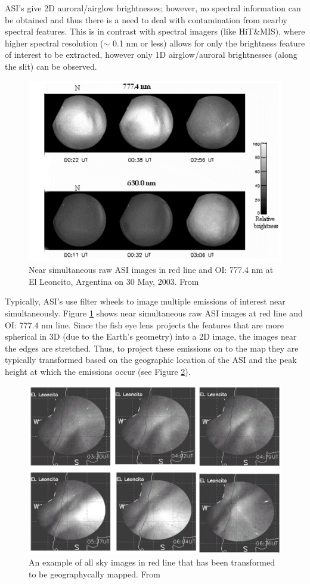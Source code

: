\documentclass[crop=false,class=mitthesis,oneside,font=12pt]{standalone}
\begin{document}
ASI's give 2D auroral/airglow brightnesses; however, no spectral information can be obtained and thus there is a need to deal with contamination from nearby spectral features. This is in contrast with spectral imagers (like HiT\&MIS), where higher spectral resolution ($\sim$ 0.1 nm or less) allows for only the brightness feature of interest to be extracted, however only 1D airglow/auroral brightnesses (along the slit) can be observed.
\begin{figure}[H]
	\centering\includegraphics[width=30pc]{asi_mul.png}
	\caption{Near simultaneous raw ASI images in red line and OI: 777.4 nm at El Leoncito, Argentina on 30 May, 2003. From \cite{martinis2006imaging}  }
	\label{fig:asi_mult}
\end{figure}

Typically, ASI's use filter wheels to image multiple emissions of interest near simultaneously. Figure \ref{fig:asi_mult} shows near simultaneous raw ASI images at red line and OI: 777.4 nm line. Since the fish eye lens projects the features that are more spherical in 3D (due to the Earth's geometry) into a 2D image, the images near the edges are stretched. Thus, to project these emissions on to the map they are typically transformed based on the geographic location of the ASI and the peak height at which the emissions occur (see Figure \ref{fig:asi_urap}).

\begin{figure}[H]
	\centering\includegraphics[width=30pc]{asi_urap.png}
	\caption{An example of all sky images in red line that has been transformed to be geographycally mapped. From \cite{martinis2006imaging} }
	\label{fig:asi_urap}
\end{figure}
\end{document}
